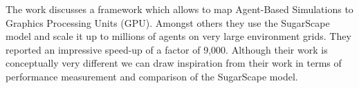 The work \cite{lysenko_framework_2008} discusses a framework which allows to map Agent-Based Simulations to Graphics Processing Units (GPU). Amongst others they use the SugarScape model \cite{epstein_growing_1996} and scale it up to millions of agents on very large environment grids. They reported an impressive speed-up of a factor of 9,000. Although their work is conceptually very different we can draw inspiration from their work in terms of performance measurement and comparison of the SugarScape model.


